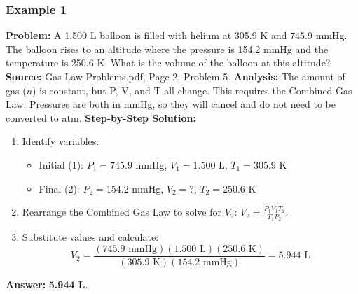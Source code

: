 \documentclass{article}
\begin{document}
\subsubsection{Example 1}
\textbf{Problem:} A 1.500 L balloon is filled with helium at 305.9 K and 745.9 mmHg. The balloon rises to an altitude where the pressure is 154.2 mmHg and the temperature is 250.6 K. What is the volume of the balloon at this altitude?
\textbf{Source:} Gas Law Problems.pdf, Page 2, Problem 5.
\textbf{Analysis:} The amount of gas ($n$) is constant, but P, V, and T all change. This requires the Combined Gas Law. Pressures are both in mmHg, so they will cancel and do not need to be converted to atm.
\textbf{Step-by-Step Solution:}
\begin{enumerate}
    \item Identify variables:
    \begin{itemize}
        \item Initial (1): $P_1 = 745.9$ mmHg, $V_1 = 1.500$ L, $T_1 = 305.9$ K
        \item Final (2): $P_2 = 154.2$ mmHg, $V_2 = ?$, $T_2 = 250.6$ K
    \end{itemize}
    \item Rearrange the Combined Gas Law to solve for $V_2$: $V_2 = \frac{P_1 V_1 T_2}{T_1 P_2}$.
    \item Substitute values and calculate:
    \[ V_2 = \frac{(745.9 \text{ mmHg})(1.500 \text{ L})(250.6 \text{ K})}{(305.9 \text{ K})(154.2 \text{ mmHg})} = 5.944 \text{ L} \]
\end{enumerate}
\textbf{Answer:} \textbf{5.944 L}.
\end{document}
